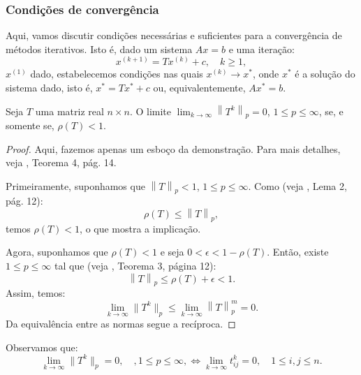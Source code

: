 \subsubsection{Condições de convergência}

Aqui, vamos discutir condições necessárias e suficientes para a convergência de métodos iterativos. Isto é, dado um sistema $Ax = b$ e uma iteração:
\begin{equation*}
  x^{(k+1)} = Tx^{(k)} + c,\quad k\geq 1,
\end{equation*}
$x^{(1)}$ dado, estabelecemos condições nas quais $x^{(k)}\to x^{*}$, onde $x^*$ é a solução do sistema dado, isto é, $x^* = Tx^* + c$ ou, equivalentemente, $Ax^* = b$.

\begin{lem}\label{lema:matriz_convergente}
  Seja $T$ uma matriz real $n\times n$. O limite $\displaystyle\lim_{k\to\infty} \left \|T^k\right \|_p = 0$, $1\leq p \leq \infty$, se, e somente se, $\rho(T) < 1$. 
\end{lem}
\begin{proof}
  Aqui, fazemos apenas um esboço da demonstração. Para mais detalhes, veja \cite{Isaacson1994a}, Teorema 4, pág. 14.

  Primeiramente, suponhamos que $\left\|T\right\|_p < 1$, $1\leq p \leq \infty$. Como (veja \cite{Isaacson1994a}, Lema 2, pág. 12):
  \begin{equation*}
    \rho(T) \leq \left\|T\right\|_p,
  \end{equation*}
temos $\rho(T) < 1$, o que mostra a implicação.

  Agora, suponhamos que $\rho(T) < 1$ e seja $0 < \epsilon < 1 - \rho(T)$. Então, existe $1\leq p \leq \infty$ tal que (veja \cite{Isaacson1994a}, Teorema 3, página 12):
  \begin{equation*}
    \left\|T\right\|_p \leq \rho(T) + \epsilon < 1.
  \end{equation*}
Assim, temos:
\begin{equation*}
  \lim_{k\to\infty} \|T^k\|_p \leq \lim_{k\to\infty} \left\|T\right\|_p^m = 0.
\end{equation*}
Da equivalência entre as normas segue a recíproca.
\end{proof}

\begin{obs}\label{obs:matriz_convergente}
  Observamos que:
  \begin{equation*}
    \lim_{k\to\infty} \|T^k\|_p = 0,\quad,1\leq p\leq \infty,\Leftrightarrow \lim_{k\to\infty} t_{ij}^k = 0,\quad 1\leq i,j\leq n.
  \end{equation*}
\end{obs}

